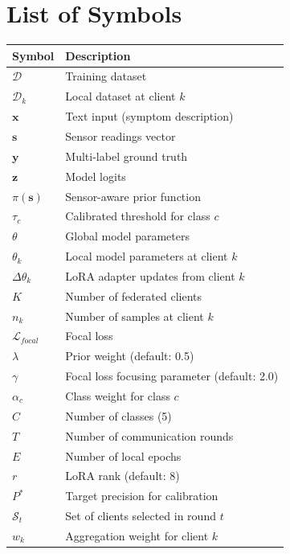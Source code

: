 \documentclass[10pt,journal,compsoc]{IEEEtran}
\begin{document}
\maketitle

\IEEEdisplaynontitleabstractindextext

\section*{List of Symbols}
\begin{table}[H]
\centering
\small
\begin{tabular}{p{1.8cm}p{6.2cm}}
\toprule
\textbf{Symbol} & \textbf{Description} \\
\midrule
$\mathcal{D}$ & Training dataset \\
$\mathcal{D}_k$ & Local dataset at client $k$ \\
$\mathbf{x}$ & Text input (symptom description) \\
$\mathbf{s}$ & Sensor readings vector \\
$\mathbf{y}$ & Multi-label ground truth \\
$\mathbf{z}$ & Model logits \\
$\pi(\mathbf{s})$ & Sensor-aware prior function \\
$\tau_c$ & Calibrated threshold for class $c$ \\
$\theta$ & Global model parameters \\
$\theta_k$ & Local model parameters at client $k$ \\
$\Delta\theta_k$ & LoRA adapter updates from client $k$ \\
$K$ & Number of federated clients \\
$n_k$ & Number of samples at client $k$ \\
$\mathcal{L}_{focal}$ & Focal loss \\
$\lambda$ & Prior weight (default: 0.5) \\
$\gamma$ & Focal loss focusing parameter (default: 2.0) \\
$\alpha_c$ & Class weight for class $c$ \\
$C$ & Number of classes (5) \\
$T$ & Number of communication rounds \\
$E$ & Number of local epochs \\
$r$ & LoRA rank (default: 8) \\
$P^*$ & Target precision for calibration \\
$\mathcal{S}_t$ & Set of clients selected in round $t$ \\
$w_k$ & Aggregation weight for client $k$ \\
\bottomrule
\end{tabular}
\end{table}
\end{document}
